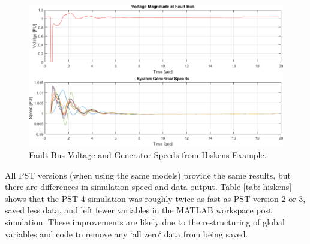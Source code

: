 \begin{figure}[H]
	\centering
	\footnotesize
	\includegraphics[width=\linewidth]{figures/hiskens/hiskensResults}
	\caption{Fault Bus Voltage and Generator Speeds from Hiskens Example.}
	\label{fig: hiskens results}
\end{figure}%

All PST versions (when using the same models) provide the same results, but there are differences in simulation speed and data output.
Table \ref{tab: hiskens} shows that the PST 4 simulation was roughly twice as fast as PST version 2 or 3, saved less data, and left fewer variables in the MATLAB workspace post simulation.
These improvements are likely due to the restructuring of global variables and code to remove any `all zero` data from being saved.\\

